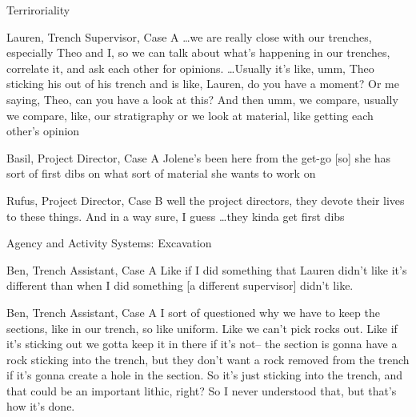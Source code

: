 \documentclass{beamer}
\begin{document}
\begin{frame}{Terriroriality}
  \begin{block}{Lauren, Trench Supervisor, Case A}
  \dots we are really close with our trenches, especially Theo and I, so we can talk about what’s happening in our trenches, correlate it, and ask each other for opinions. \dots Usually it’s like, umm, Theo sticking his out of his trench and is like, Lauren, do you have a moment? Or me saying, Theo, can you have a look at this? And then umm, we compare, usually we compare, like, our stratigraphy or we look at material, like getting each other’s opinion
  \end{block}
  
  \begin{block}{Basil, Project Director, Case A}
  Jolene’s been here from the get-go [so] she has sort of first dibs on what sort of material she wants to work on
  \end{block}

  \begin{block}{Rufus, Project Director, Case B}
  well the project directors, they devote their lives to these things. And in a way sure, I guess \dots they kinda get first dibs
\end{block}


\end{frame}

\begin{frame}{Agency and Activity Systems: Excavation}

  \begin{block}{Ben, Trench Assistant, Case A}
    Like if I did something that Lauren didn’t like it’s different than when I did something [a different supervisor] didn’t like.
  \end{block}
  
  \begin{block}{Ben, Trench Assistant, Case A}
    I sort of questioned why we have to keep the sections, like in our trench, so like uniform. Like we can’t pick rocks out. Like if it’s sticking out we gotta keep it in there if it’s not-- the section is gonna have a rock sticking into the trench, but they don’t want a rock removed from the trench if it’s gonna create a hole in the section. So it’s just sticking into the trench, and that could be an important lithic, right? So I never understood that, but that’s how it’s done.
  \end{block}

\end{frame}
\end{document}

